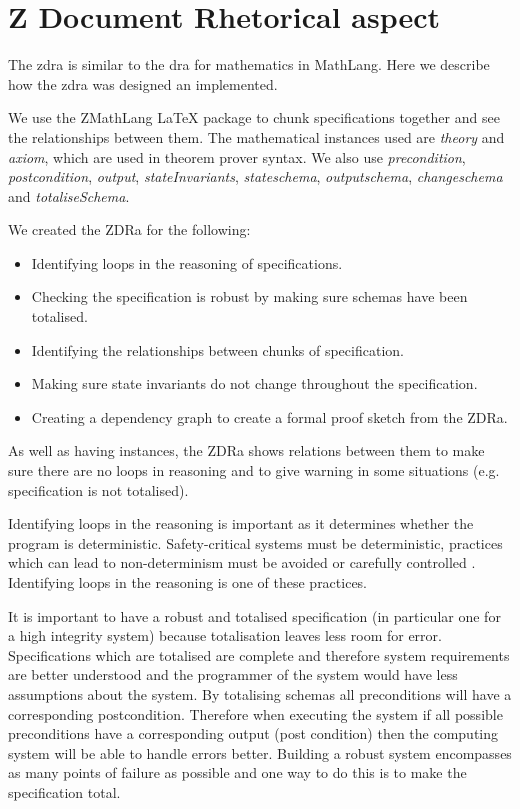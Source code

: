\chapter{Z Document Rhetorical aspect}
\label{ch:zdra}
The \gls{zdra} is similar to the \gls{dra} for mathematics in MathLang. Here we describe how
the \gls{zdra} was designed an implemented. 

We use the ZMathLang \LaTeX{} package to chunk specifications together and see
the relationships between them. The mathematical instances used are
\textit{theory} and \textit{axiom}, which are used in theorem prover syntax. We
also use \textit{precondition}, \textit{postcondition}, \textit{output},
\textit{stateInvariants}, \textit{stateschema}, \textit{outputschema},
\textit{changeschema} and \textit{totaliseSchema}.

We created the ZDRa for the following:

\begin{itemize}

\item Identifying loops in the reasoning of specifications.
\item Checking the specification is robust by making sure schemas have been
totalised.
\item Identifying the relationships between chunks of specification.
\item Making sure state invariants do not change throughout the specification.
\item Creating a dependency graph to create a formal proof sketch from the ZDRa.
\end{itemize}

As well as having instances, the ZDRa shows relations between them to make sure
there are no loops in reasoning and to give warning in some situations (e.g.
specification is not totalised).

Identifying loops in the reasoning is important as it determines whether the
program is deterministic. Safety-critical systems must be deterministic,
practices which can lead to non-determinism must be avoided or carefully
controlled \cite{rierson2013developing}. Identifying loops in the reasoning is one of these practices. 

It is important to have a robust and totalised specification (in particular one
for a high integrity system) because totalisation leaves less room for error.
Specifications which are totalised are complete and therefore system
requirements are better understood and the programmer of the system would have
less assumptions about the system.
By totalising schemas all preconditions will have a corresponding postcondition.
Therefore when executing the system if all possible preconditions have a
corresponding output (post condition) then the computing system will be able to
handle errors better. Building a robust system encompasses as many points of
failure  as possible and one way to do this is to make the specification total.

